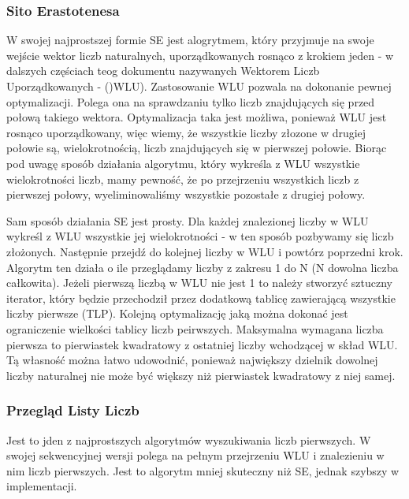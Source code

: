 \documentclass{article}
\begin{document}
            \subsubsection{Sito Erastotenesa}
                W swojej najprostszej formie \gls{SE} jest alogrytmem, który przyjmuje na swoje wejście wektor liczb naturalnych, uporządkowanych rosnąco z krokiem jeden - w dalszych częściach teog dokumentu nazywanych Wektorem Liczb Uporządkowanych - ()\gls{WLU}). Zastosowanie \gls{WLU} pozwala na dokonanie pewnej optymalizacji. Polega ona na sprawdzaniu tylko liczb znajdujących się przed połową takiego wektora. Optymalizacja taka jest możliwa, ponieważ \gls{WLU} jest rosnąco uporządkowany, więc wiemy, że wszystkie liczby złozone w drugiej połowie są, wielokrotnością, liczb znajdujących się w pierwszej połowie. Biorąc pod uwagę sposób działania algorytmu, który wykreśla z \gls{WLU} wszystkie wielokrotności liczb, mamy pewność, że po przejrzeniu wszystkich liczb z pierwszej połowy, wyeliminowaliśmy wszystkie pozostałe z drugiej połowy.
                
                Sam sposób działania \gls{SE} jest prosty. Dla każdej znalezionej liczby w \gls{WLU} wykreśl z \gls{WLU} wszystkie jej wielokrotności - w ten sposób pozbywamy się liczb złożonych. Następnie przejdź do kolejnej liczby w \gls{WLU} i powtórz poprzedni krok. Algorytm ten działa o ile przeglądamy liczby z zakresu 1 do N (N dowolna liczba całkowita). Jeżeli pierwszą liczbą w \gls{WLU} nie jest 1 to należy stworzyć sztuczny iterator, który będzie przechodził przez dodatkową tablicę zawierającą wszystkie liczby pierwsze (\gls{TLP}). Kolejną optymalizację jaką można dokonać jest ograniczenie wielkości tablicy liczb peirwszych. Maksymalna wymagana liczba pierwsza to pierwiastek kwadratowy z ostatniej liczby wchodzącej w skład \gls{WLU}. Tą własność można łatwo udowodnić, ponieważ największy dzielnik dowolnej liczby naturalnej nie może być większy niż pierwiastek kwadratowy z niej samej.
            
            \subsubsection{Przegląd Listy Liczb}
                Jest to jden z najprostszych algorytmów wyszukiwania liczb pierwszych. W swojej sekwencyjnej wersji polega na pełnym przejrzeniu \gls{WLU} i znalezieniu w nim liczb pierwszych. Jest to algorytm mniej skuteczny niż \gls{SE}, jednak szybszy w implementacji.
                
\end{document}
